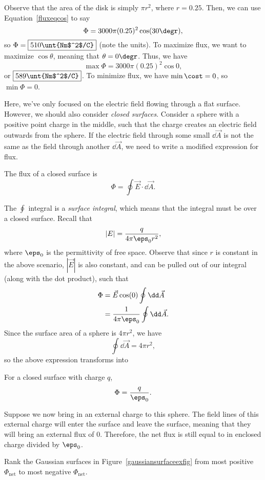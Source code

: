 \documentclass[11pt]{article}
\begin{document}
\begin{solution}
	Observe that the area of the disk is simply $\pi r^2$, where $r= 0.25$. Then, we can use Equation~\ref{fluxeqcos} to say
	\[\Phi = 3000\pi(0.25)^2\cos(30\degr),\]
	so $\Phi = \boxed{510 \unt{Nm$^2$/C}}$ (note the units). To maximize flux, we want to maximize $\cos\theta$, meaning that $\theta = 0\degr$. Thus, we have
	\[\max\Phi = 3000\pi(0.25)^2\cos 0,\]
	or $\boxed{589\unt{Nm$^2$/C}}$. To minimize flux, we have $\min\cost = 0$, so $\min\Phi = 0$.
\end{solution}
Here, we've only focused on the electric field flowing through a flat surface. However, we should also consider \textit{closed surfaces}. Consider a sphere with a positive point charge in the middle, such that the charge creates an electric field outwards from the sphere. If the electric field through some small $\dd \vec{A}$ is not the same as the field through another $\dd \vec{A}$, we need to write a modified expression for flux.
\begin{eqn}
	The flux of a closed surface is
	\begin{equation}
		\Phi = \oint \vec{E}\cdot\dd \vec{A}.
	\end{equation}
\end{eqn}
The $\oint$ integral is a \textit{surface integral}, which means that the integral must be over a closed surface. Recall that
\[|E| = \frac{q}{4\pi\eps_0r^2},\]
where $\eps_0$ is the permittivity of free space. Observe that since $r$ is constant in the above scenario, $|\vec{E}|$ is also constant, and can be pulled out of our integral (along with the dot product), such that
\begin{align*}
	\Phi &= \vec{E}\cos(0)\oint \dd \vec{A} \\
	&= \frac{1}{4\pi\eps_0}\oint \dd \vec{A}.	
\end{align*}
Since the surface area of a sphere is $4\pi r^2$, we have\[\oint \dd \vec{A} = 4\pi r^2,\] so the above expression transforms into
\begin{eqn}
	For a closed surface with charge $q$,
	\[\Phi = \frac{q}{\eps_0}.\]
\end{eqn}
Suppose we now bring in an external charge to this sphere. The field lines of this external charge will enter the surface and leave the surface, meaning that they will bring an external flux of 0. Therefore, the net flux is still equal to in enclosed charge divided by $\eps_0$.
\begin{example}\label{gaussiansurfaceex}
	Rank the Gaussian surfaces in Figure~\ref{gaussiansurfaceexfig} from most positive $\Phi_{\text{net}}$ to most negative $\Phi_{\text{net}}$.	
\end{example}
\end{document}
